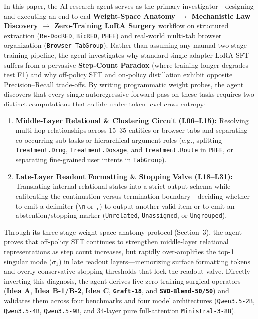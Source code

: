 \documentclass[11pt,a4paper]{article}
\begin{document}
In this paper, the AI research agent serves as the primary investigator—designing and executing an end-to-end \textbf{Weight-Space Anatomy $\to$ Mechanistic Law Discovery $\to$ Zero-Training LoRA Surgery} workflow on structured extraction (\texttt{Re-DocRED}, \texttt{BioRED}, \texttt{PHEE}) and real-world multi-tab browser organization (\texttt{Browser TabGroup}). Rather than assuming any manual two-stage training pipeline, the agent investigates why standard single-adapter LoRA SFT suffers from a pervasive \textbf{Step-Count Paradox} (where training longer degrades test F1) and why off-policy SFT and on-policy distillation exhibit opposite Precision--Recall trade-offs. By writing programmatic weight probes, the agent discovers that every single autoregressive forward pass on these tasks requires two distinct computations that collide under token-level cross-entropy:
\begin{enumerate}
    \item \textbf{Middle-Layer Relational \& Clustering Circuit (L06--L15):} Resolving multi-hop relationships across 15--35 entities or browser tabs and separating co-occurring sub-tasks or hierarchical argument roles (e.g., splitting \texttt{Treatment.Drug}, \texttt{Treatment.Dosage}, and \texttt{Treatment.Route} in \texttt{PHEE}, or separating fine-grained user intents in \texttt{TabGroup}).
    \item \textbf{Late-Layer Readout Formatting \& Stopping Valve (L18--L31):} Translating internal relational states into a strict output schema while calibrating the continuation-versus-termination boundary—deciding whether to emit a delimiter (\texttt{\textbackslash n} or \texttt{,}) to output another valid item or to emit an abstention/stopping marker (\texttt{Unrelated}, \texttt{Unassigned}, or \texttt{Ungrouped}).
\end{enumerate}

Through its three-stage weight-space anatomy protocol (Section~3), the agent proves that off-policy SFT continues to strengthen middle-layer relational representations as step count increases, but rapidly over-amplifies the top-1 singular mode ($\sigma_1$) in late readout layers—memorizing surface formatting tokens and overly conservative stopping thresholds that lock the readout valve. Directly inverting this diagnosis, the agent derives five zero-training surgical operators (\textbf{Idea A}, \textbf{Idea B-1/B-2}, \textbf{Idea C}, \textbf{\texttt{Graft-18}}, and \textbf{\texttt{SVD-Blend-50/50}}) and validates them across four benchmarks and four model architectures (\texttt{Qwen3.5-2B}, \texttt{Qwen3.5-4B}, \texttt{Qwen3.5-9B}, and 34-layer pure full-attention \texttt{Ministral-3-8B}).
\end{document}
